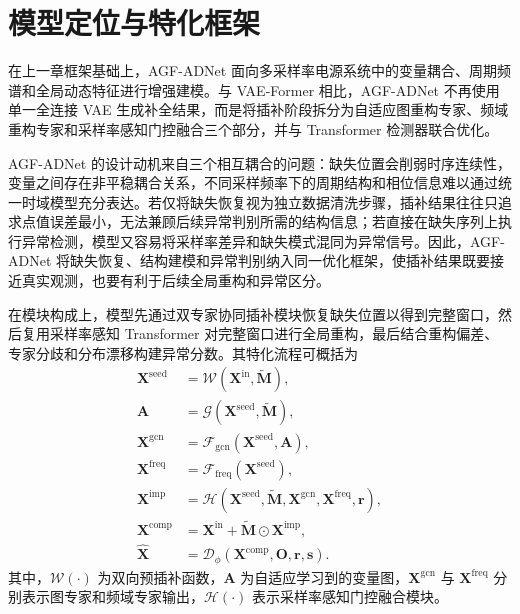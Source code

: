 \documentclass[bachelor, vlined]{DissertUESTC}
\begin{document}
    \section{模型定位与特化框架}

    在上一章框架基础上，AGF-ADNet 面向多采样率电源系统中的变量耦合、周期频谱和全局动态特征进行增强建模。与 VAE-Former 相比，AGF-ADNet 不再使用单一全连接 VAE 生成补全结果，而是将插补阶段拆分为自适应图重构专家、频域重构专家和采样率感知门控融合三个部分，并与 Transformer 检测器联合优化。

    AGF-ADNet 的设计动机来自三个相互耦合的问题：缺失位置会削弱时序连续性，变量之间存在非平稳耦合关系，不同采样频率下的周期结构和相位信息难以通过统一时域模型充分表达。若仅将缺失恢复视为独立数据清洗步骤，插补结果往往只追求点值误差最小，无法兼顾后续异常判别所需的结构信息；若直接在缺失序列上执行异常检测，模型又容易将采样率差异和缺失模式混同为异常信号。因此，AGF-ADNet 将缺失恢复、结构建模和异常判别纳入同一优化框架，使插补结果既要接近真实观测，也要有利于后续全局重构和异常区分。

    在模块构成上，模型先通过双专家协同插补模块恢复缺失位置以得到完整窗口，然后复用采样率感知 Transformer 对完整窗口进行全局重构，最后结合重构偏差、专家分歧和分布漂移构建异常分数。其特化流程可概括为
    \begin{align}
        \mathbf{X}^{\mathrm{seed}} &= \mathcal{W}\!\left(\mathbf{X}^{\mathrm{in}}, \widetilde{\mathbf{M}}\right), \\
        \mathbf{A} &= \mathcal{G}\!\left(\mathbf{X}^{\mathrm{seed}}, \widetilde{\mathbf{M}}\right), \\
        \mathbf{X}^{\mathrm{gcn}} &= \mathcal{F}_{\mathrm{gcn}}\!\left(\mathbf{X}^{\mathrm{seed}}, \mathbf{A}\right), \\
        \mathbf{X}^{\mathrm{freq}} &= \mathcal{F}_{\mathrm{freq}}\!\left(\mathbf{X}^{\mathrm{seed}}\right), \\
        \mathbf{X}^{\mathrm{imp}} &= \mathcal{H}\!\left(\mathbf{X}^{\mathrm{seed}}, \widetilde{\mathbf{M}}, \mathbf{X}^{\mathrm{gcn}}, \mathbf{X}^{\mathrm{freq}}, \mathbf{r}\right), \\
        \mathbf{X}^{\mathrm{comp}} &= \mathbf{X}^{\mathrm{in}} + \widetilde{\mathbf{M}} \odot \mathbf{X}^{\mathrm{imp}}, \\
        \hat{\mathbf{X}} &= \mathcal{D}_{\phi}\!\left(\mathbf{X}^{\mathrm{comp}}, \mathbf{O}, \mathbf{r}, \mathbf{s}\right).
    \end{align}
    其中，$\mathcal{W}(\cdot)$ 为双向预插补函数，$\mathbf{A}$ 为自适应学习到的变量图，$\mathbf{X}^{\mathrm{gcn}}$ 与 $\mathbf{X}^{\mathrm{freq}}$ 分别表示图专家和频域专家输出，$\mathcal{H}(\cdot)$ 表示采样率感知门控融合模块。
\end{document}
